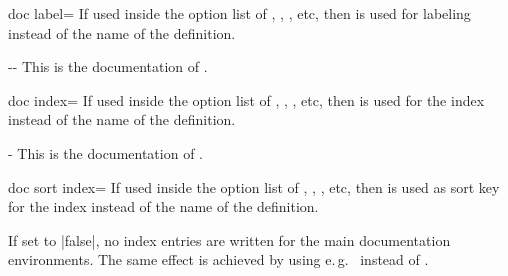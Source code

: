 \clearpage

\begin{docTcbKey}[][doc new={2019-09-18}]{doc label}{=}{\tcbdocdescNoDefaultInit}
  If used inside the option list of , ,
  , etc, then  is used
  for labeling instead of the name of the definition.
\begin{dispExample}
\begin{docPathOperation*}[doc label=pathline]{-{}-}{}
  This is the documentation of .
\end{docPathOperation*}
\end{dispExample}
\end{docTcbKey}

\begin{docTcbKey}[][doc new={2020-01-07}]{doc index}{=}{\tcbdocdescNoDefaultInit}
  If used inside the option list of , ,
  , etc, then  is used
  for the index instead of the name of the definition.
\begin{dispExample}
\begin{docPathOperation}[doc index=foo path (horizontal then vertical),
    doc label=pathline2]{-\textbar}{}
  This is the documentation of .
\end{docPathOperation}
\end{dispExample}
\end{docTcbKey}


\begin{docTcbKey}[][doc new={2020-04-23}]{doc sort index}{=}{\tcbdocdescNoDefaultInit}
  If used inside the option list of , ,
  , etc, then  is used
  as sort key for the index instead of the name of the definition.
\begin{dispListing}
\begin{docCommands}[
    doc name        = l_tcobox_example_tl,
    doc sort index  = example_tl,  %
  ]{}
\end{docCommands}
\end{dispListing}
\end{docTcbKey}


\begin{docTcbKeys}[
    doc name         = doc into index,
    doc key choices* = {defaultinit=true,false},
  ]{}
  If set to |false|, no index entries are written for the main documentation
  environments. The same effect is achieved by using e.\,g.\ 
  instead of .
\end{docTcbKeys}


